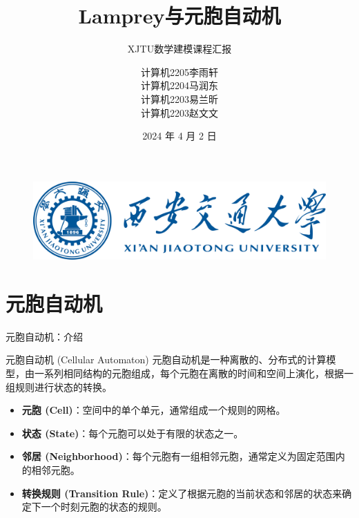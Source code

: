 \documentclass{beamer}
\author[XJTU数学建模课程汇报]{计算机2205\hspace{0.1cm}李雨轩\\
计算机2204\hspace{0.1cm}马润东\\
计算机2203\hspace{0.1cm}易兰昕\\
计算机2203\hspace{0.1cm}赵文文}
\title{Lamprey与元胞自动机}
\subtitle{XJTU数学建模课程汇报}
\date{2024 年 4 月 2 日}
\institute{Team. 26}
\begin{document}
\kaishu
\begin{frame}
    \titlepage

    \begin{figure}[htpb]
        \begin{center}
            \includegraphics[width=0.3\linewidth]{pic/title.png}
        \end{center}
    \end{figure}
\end{frame}

\begin{frame}
\tableofcontents[sectionstyle=show,subsectionstyle=show/shaded/hide,subsubsectionstyle=show/shaded/hide]
\end{frame}



\section{元胞自动机}

\begin{frame}{元胞自动机：介绍}
    
    \begin{block}{元胞自动机 (Cellular Automaton)}
        元胞自动机是一种离散的、分布式的计算模型，由一系列相同结构的元胞组成，每个元胞在离散的时间和空间上演化，根据一组规则进行状态的转换。
    \end{block}
    
    \begin{itemize}
        \item \textbf{元胞 (Cell)}：空间中的单个单元，通常组成一个规则的网格。
        \item \textbf{状态 (State)}：每个元胞可以处于有限的状态之一。
        \item \textbf{邻居 (Neighborhood)}：每个元胞有一组相邻元胞，通常定义为固定范围内的相邻元胞。
        \item \textbf{转换规则 (Transition Rule)}：定义了根据元胞的当前状态和邻居的状态来确定下一个时刻元胞的状态的规则。
    \end{itemize}

\end{frame}
\end{document}
